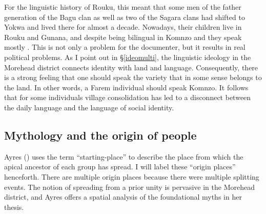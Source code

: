 For the linguistic history of Rouku, this meant that some men of the father generation of the Bagu clan as well as two of the Sagara clans had shifted to Yokwa and lived there for almost a decade. Nowadays, their children live in Rouku and Gunana, and despite being bilingual in Komnzo and  they speak mostly . This is not only a problem for the documenter, but it results in real political problems. As I point out in \S{}\ref{ideomulti}, the linguistic ideology in the Morehead district connects identity with land and language. Consequently, there is a strong feeling that one should speak the variety that in some sense belongs to the land. In other words, a Farem individual should speak Komnzo. It follows that for some individuals village consolidation has led to a disconnect between the daily language and the language of social identity.

\subsection{Mythology and the origin of people}\label{mythology}

Ayres (\citeyear[146]{Ayres:ws}) uses the term ``starting-place'' to describe the place from which the apical ancestor of each group has spread. I will label these ``origin places'' henceforth. There are multiple origin places because there were multiple splitting events. The notion of spreading from a prior unity is pervasive in the Morehead district, and Ayres offers a spatial analysis of the foundational myths in her thesis.%

